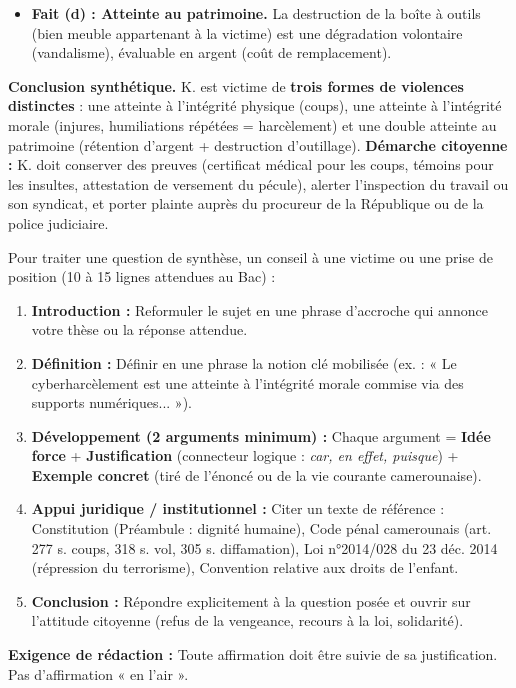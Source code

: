 \documentclass[11pt]{article}
\newcommand{\cle}[1]{{\popxbold\color{popdark}#1}}
\begin{document}
\begin{exoresolu}
\begin{enumerate}
\begin{itemize}
\item \textbf{Fait (d) : Atteinte au patrimoine.} La destruction de la boîte à outils (bien meuble appartenant à la victime) est une \cle{dégradation volontaire} (vandalisme), évaluable en argent (coût de remplacement).
\end{itemize}
\end{enumerate}
\textbf{Conclusion synthétique.} K. est victime de \textbf{trois formes de violences distinctes} : une atteinte à l'intégrité physique (coups), une atteinte à l'intégrité morale (injures, humiliations répétées = harcèlement) et une double atteinte au patrimoine (rétention d'argent + destruction d'outillage).
\textbf{Démarche citoyenne :} K. doit conserver des preuves (certificat médical pour les coups, témoins pour les insultes, attestation de versement du pécule), alerter l'inspection du travail ou son syndicat, et porter plainte auprès du procureur de la République ou de la police judiciaire.
\end{exoresolu}

\begin{methode}
Pour traiter une question de synthèse, un conseil à une victime ou une prise de position (10 à 15 lignes attendues au Bac) :
\begin{enumerate}
\item \textbf{Introduction :} Reformuler le sujet en une phrase d'accroche qui annonce votre thèse ou la réponse attendue.
\item \textbf{Définition :} Définir en une phrase la notion clé mobilisée (ex. : « Le cyberharcèlement est une atteinte à l'intégrité morale commise via des supports numériques... »).
\item \textbf{Développement (2 arguments minimum) :} Chaque argument = \textbf{Idée force} + \textbf{Justification} (connecteur logique : \emph{car, en effet, puisque}) + \textbf{Exemple concret} (tiré de l'énoncé ou de la vie courante camerounaise).
\item \textbf{Appui juridique / institutionnel :} Citer un texte de référence : Constitution (Préambule : dignité humaine), Code pénal camerounais (art. 277 s. coups, 318 s. vol, 305 s. diffamation), Loi n°2014/028 du 23 déc. 2014 (répression du terrorisme), Convention relative aux droits de l'enfant.
\item \textbf{Conclusion :} Répondre explicitement à la question posée et ouvrir sur l'attitude citoyenne (refus de la vengeance, recours à la loi, solidarité).
\end{enumerate}
\textbf{Exigence de rédaction :} Toute affirmation doit être suivie de sa justification. Pas d'affirmation « en l'air ».
\end{methode}
\end{document}
